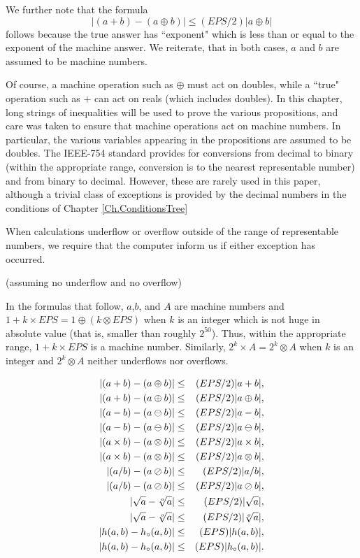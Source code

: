 \begin{conventions}
We further note that the formula 
$$|(a + b) - (a \oplus b)| \leq (EPS/2) |a \oplus b|$$
follows because the true answer has ``exponent" which is less than or equal to the exponent of the machine answer.  We reiterate, that in both cases, $a$ and $b$ are assumed to be machine numbers.

Of course, a machine operation such as $\oplus$ must act on doubles, while a ``true" operation such as $+$ can act on reals (which includes doubles).
In this chapter,
long strings of inequalities will be used to prove the various propositions, and care was taken to ensure that machine operations act on machine numbers.  In particular, the various variables appearing in the propositions are assumed to be doubles. The IEEE-754 standard provides for conversions from decimal to binary (within the appropriate range, conversion is to the nearest representable number) and from binary to decimal.  However, these are rarely used in this paper, although a trivial class of exceptions is provided by the decimal numbers in the conditions of
	Chapter \ref{Ch.ConditionsTree}

When calculations underflow or overflow outside of the range of representable numbers, we require that the computer inform us if either exception has occurred. \end{conventions} 

\begin{basic properties} \label{GMT basic7.0}(assuming no underflow and no overflow)

In the formulas that follow, $a$,$b$, and $A$ are machine numbers and
$1 + k \times EPS = 1 \oplus (k \otimes EPS)$ when $k$ is an integer which is not huge in absolute value (that is, 
smaller than roughly $2^{50}$).  Thus, within the appropriate range,  $1 + k \times EPS$ is a machine number.  Similarly,
$2^k
\times A = 2^k \otimes A$ when $k$ is an integer and  $2^k \otimes A$ neither underflows nor overflows.\end{basic properties}
\begin{eqnarray*}
|(a + b) - (a \oplus b)| &\leq& (EPS/2) |a + b|,\\
|(a + b) - (a \oplus b)|&\leq& (EPS/2) |a \oplus b|,\\
|(a - b) - (a \ominus b)| &\leq& (EPS/2) |a - b|,\\
|(a - b) - (a \ominus b)|&\leq& (EPS/2) |a \ominus b|,\\
|(a \times b) - (a \otimes b)| &\leq& (EPS/2) |a \times b|,\\
|(a \times b) - (a \otimes b)| &\leq&(EPS/2) |a \otimes b|,\\
|(a / b) - (a \oslash b)| &\leq& (EPS/2) |a / b|,\\
|(a / b) - (a \oslash b)| &\leq& (EPS/2) |a \oslash b|,\\
|\sqrt a - \root o \of a| &\leq& (EPS/2) |\sqrt a|,\\
|\sqrt a - \root o \of a|  &\leq&  (EPS/2) |\root o \of a|,\\
|h(a,b) - h_\circ(a,b)| &\leq& (EPS) |h(a,b)|,\\
|h(a,b) - h_\circ(a,b)| &\leq&   (EPS) |h_\circ(a,b)|.
\end{eqnarray*}

